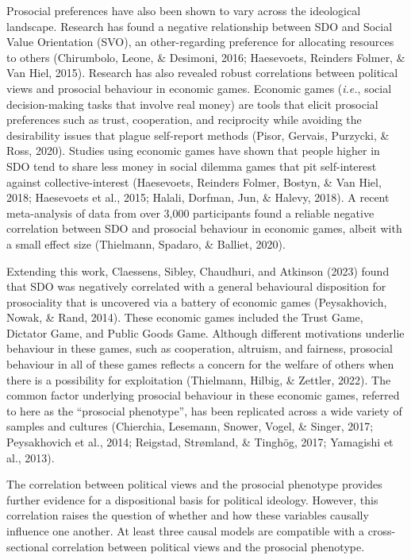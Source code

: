 \documentclass[
  man,floatsintext]{apa6}
\begin{document}
Prosocial preferences have also been shown to vary across the ideological
landscape. Research has found a negative relationship between SDO and
Social Value Orientation (SVO), an other-regarding preference for allocating
resources to others (Chirumbolo, Leone, \& Desimoni, 2016; Haesevoets, Reinders Folmer, \& Van Hiel, 2015). Research has also
revealed robust correlations between political views and prosocial behaviour in
economic games. Economic games (\emph{i.e.}, social decision-making tasks that
involve real money) are tools that elicit prosocial preferences such as
trust, cooperation, and reciprocity while avoiding the desirability issues that
plague self-report methods (Pisor, Gervais, Purzycki, \& Ross, 2020). Studies using economic games have shown
that people higher in SDO tend to share less money in social dilemma games that
pit self-interest against collective-interest (Haesevoets, Reinders Folmer, Bostyn, \& Van Hiel, 2018; Haesevoets et al., 2015; Halali, Dorfman, Jun, \& Halevy, 2018). A recent meta-analysis of data from over 3,000 participants found
a reliable negative correlation between SDO and prosocial behaviour in economic
games, albeit with a small effect size (Thielmann, Spadaro, \& Balliet, 2020).

Extending this work, Claessens, Sibley, Chaudhuri, and Atkinson (2023) found that SDO was negatively correlated
with a general behavioural disposition for prosociality that is uncovered via a
battery of economic games (Peysakhovich, Nowak, \& Rand, 2014). These economic games included
the Trust Game, Dictator Game, and Public Goods Game. Although different
motivations underlie behaviour in these games, such as cooperation, altruism,
and fairness, prosocial behaviour in all of these games reflects a concern for
the welfare of others when there is a possibility for exploitation
(Thielmann, Hilbig, \& Zettler, 2022). The common factor underlying prosocial behaviour in these
economic games, referred to here as the ``prosocial phenotype'', has been
replicated across a wide variety of samples and cultures (Chierchia, Lesemann, Snower, Vogel, \& Singer, 2017; Peysakhovich et al., 2014; Reigstad, Strømland, \& Tinghög, 2017; Yamagishi et al., 2013).

The correlation between political views and the prosocial phenotype provides
further evidence for a dispositional basis for political ideology. However, this
correlation raises the question of whether and how these variables causally
influence one another. At least three causal models are compatible with a
cross-sectional correlation between political views and the prosocial
phenotype.
\end{document}
